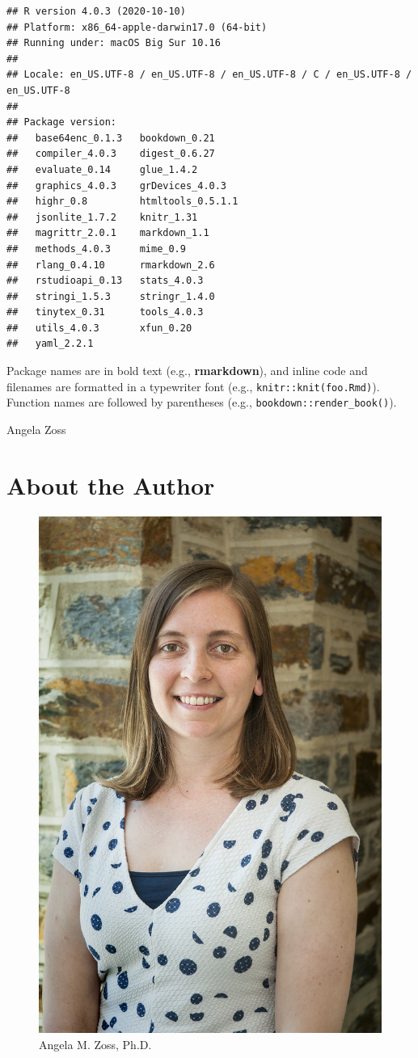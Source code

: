 \documentclass[
]{krantz}
\begin{document}
\begin{verbatim}
## R version 4.0.3 (2020-10-10)
## Platform: x86_64-apple-darwin17.0 (64-bit)
## Running under: macOS Big Sur 10.16
## 
## Locale: en_US.UTF-8 / en_US.UTF-8 / en_US.UTF-8 / C / en_US.UTF-8 / en_US.UTF-8
## 
## Package version:
##   base64enc_0.1.3   bookdown_0.21    
##   compiler_4.0.3    digest_0.6.27    
##   evaluate_0.14     glue_1.4.2       
##   graphics_4.0.3    grDevices_4.0.3  
##   highr_0.8         htmltools_0.5.1.1
##   jsonlite_1.7.2    knitr_1.31       
##   magrittr_2.0.1    markdown_1.1     
##   methods_4.0.3     mime_0.9         
##   rlang_0.4.10      rmarkdown_2.6    
##   rstudioapi_0.13   stats_4.0.3      
##   stringi_1.5.3     stringr_1.4.0    
##   tinytex_0.31      tools_4.0.3      
##   utils_4.0.3       xfun_0.20        
##   yaml_2.2.1
\end{verbatim}

Package names are in bold text (e.g., \textbf{rmarkdown}), and inline code and filenames are formatted in a typewriter font (e.g., \texttt{knitr::knit(\textquotesingle{}foo.Rmd\textquotesingle{})}). Function names are followed by parentheses (e.g., \texttt{bookdown::render\_book()}).

\begin{flushright}
Angela Zoss
\end{flushright}

\hypertarget{about-the-author}{%
\chapter*{About the Author}\label{about-the-author}}


\begin{figure}
\includegraphics[width=0.328\linewidth]{images/angela_zoss} \caption{Angela M. Zoss, Ph.D.}\label{fig:knitr-logo}
\end{figure}
\end{document}
